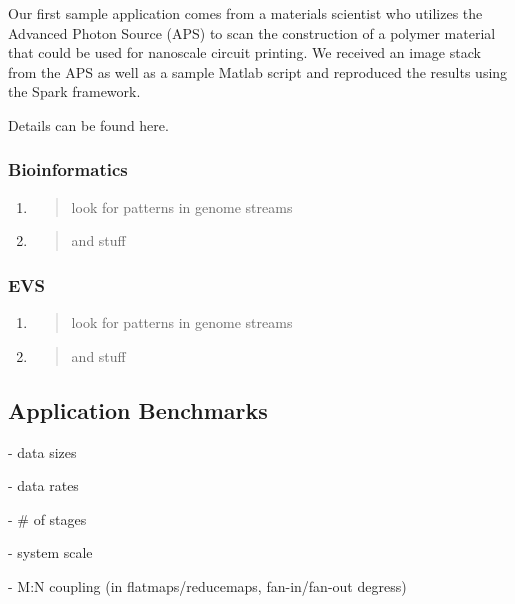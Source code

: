 Our first sample application comes from a materials scientist who
utilizes the Advanced Photon Source (APS) to scan the construction of a
polymer material that could be used for nanoscale circuit printing. We
received an image stack from the APS as well as a sample Matlab script
and reproduced the results using the Spark framework.

Details can be found here.

\subsubsection{Bioinformatics}\label{bioinformatics}

\begin{enumerate}
\def\labelenumi{\arabic{enumi}.}
\item
  \begin{quote}
  look for patterns in genome streams
  \end{quote}
\item
  \begin{quote}
  and stuff
  \end{quote}
\end{enumerate}

\subsubsection{EVS}\label{evs}

\begin{enumerate}
\def\labelenumi{\arabic{enumi}.}
\item
  \begin{quote}
  look for patterns in genome streams
  \end{quote}
\item
  \begin{quote}
  and stuff
  \end{quote}
\end{enumerate}

\subsection{Application Benchmarks}\label{application-benchmarks}

- data sizes

- data rates

- \# of stages

- system scale

- M:N coupling (in flatmaps/reducemaps, fan-in/fan-out degress)

